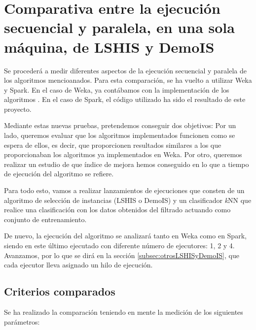 

\section{Comparativa entre la ejecución secuencial y paralela, en una sola máquina, de LSHIS y DemoIS}\label{sec:pruebasLSHISyDemoIS}

Se procederá a medir diferentes aspectos de la ejecución secuencial y paralela de los algoritmos mencioanados. Para esta comparación, se ha vuelto a utilizar Weka y Spark. En el caso de Weka, ya contábamos con la implementación de los algoritmos \cite{arnaiz2012herramienta}. En el caso de Spark, el código utilizado ha sido el resultado de este proyecto.

Mediante estas nuevas pruebas, pretendemos conseguir dos objetivos: Por un lado, queremos evaluar que los algoritmos implementados funcionen como se espera de ellos, es decir, que proporcionen resultados similares a los que proporcionaban los algoritmos ya implementados en Weka. Por otro, queremos realizar un estudio de que índice de mejora hemos conseguido en lo que a tiempo de ejecución del algoritmo se refiere.

Para todo esto, vamos a realizar lanzamientos de ejecuciones que consten de un algoritmo de selección de instancias (LSHIS o DemoIS) y un clasificador \textit{k}NN que realice una clasificación con los datos obtenidos del filtrado actuando como conjunto de entrenamiento.

De nuevo, la ejecución del algoritmo se analizará tanto en Weka como en Spark, siendo en este último ejecutado con diferente número de ejecutores: 1, 2 y 4. Avanzamos, por lo que se dirá en la sección \ref{subsec:otrosLSHISyDemoIS}, que cada ejecutor lleva asignado un hilo de ejecución.

\subsection{Criterios comparados}

Se ha realizado la comparación teniendo en mente la medición de los siguientes parámetros:


